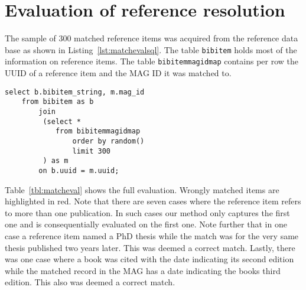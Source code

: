 \chapter{Evaluation of reference resolution}\label{chap:matcheval}

The sample of 300 matched reference items was acquired from the reference data base as shown in Listing~\ref{lst:matchevalsql}. The table \texttt{bibitem} holds most of the information on reference items. The table \texttt{bibitemmagidmap} contains per row the UUID of a reference item and the MAG ID it was matched to.

\begin{lstlisting}[caption={SQL query used to acquire the sample},label={lst:matchevalsql}]
select b.bibitem_string, m.mag_id
    from bibitem as b
        join
         (select *
            from bibitemmagidmap
                order by random()
                limit 300
         ) as m
        on b.uuid = m.uuid;
\end{lstlisting}

Table~\ref{tbl:matcheval} shows the full evaluation. Wrongly matched items are {\color{UniRed}highlighted in red}. Note that there are seven cases where the reference item refers to more than one publication. In such cases our method only captures the first one and is consequentially evaluated on the first one. Note further that in one case a reference item named a PhD thesis while the match was for the very same thesis published two years later. This was deemed a correct match. Lastly, there was one case where a book was cited with the date indicating its second edition while the matched record in the MAG has a date indicating the books third edition. This also was deemed a correct match.
\newpage

